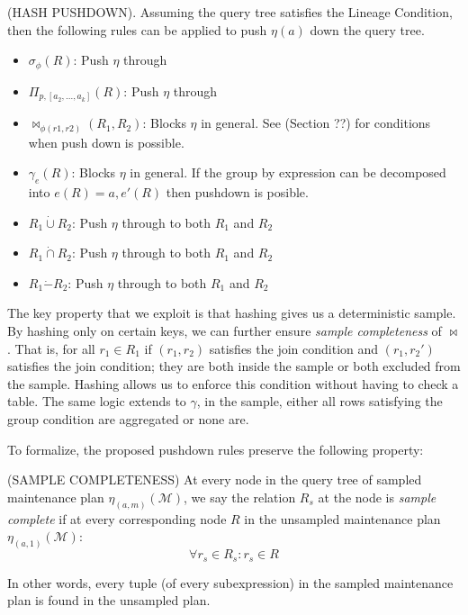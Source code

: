 \begin{proposition}
(HASH PUSHDOWN). Assuming the query tree satisfies the Lineage Condition, then the following rules can be applied to push $\eta(a)$ down the query tree. 
\begin{itemize}\vspace{-.45em}
\item $\sigma_{\phi}(R)$: Push $\eta$ through \vspace{-.45em}
\item $\Pi_{p,[a_2,...,a_k]}(R)$: Push $\eta $ through \vspace{-.45em}
\item $\bowtie_{\phi (r1,r2)}(R_1,R_2)$: Blocks $\eta $ in general. See (Section ??) for conditions when push down is possible.
\item $\gamma_{e}(R)$: Blocks $\eta$ in general. If the group by expression can be decomposed into $e(R) = a, e'(R)$ then pushdown is posible.\vspace{-.45em}
\item $R_1 \dot{\cup} R_2$: Push $\eta $ through to both $R_1$ and $R_2$
\item $R_1 \dot{\cap} R_2$: Push $\eta $ through to both $R_1$ and $R_2$
\item $R_1 \dot{-} R_2$: Push $\eta $ through to both $R_1$ and $R_2$
\end{itemize}
\end{proposition}

The key property that we exploit is that hashing gives us a deterministic sample.
By hashing only on certain keys, we can further ensure \emph{sample completeness} of $\bowtie$.
That is, for all $r_1\in R_1$ if $(r_1,r_2)$ satisfies the join condition and $(r_1,r_2')$ satisfies the join condition; they are both inside the sample or both excluded from the sample. 
Hashing allows us to enforce this condition without having to check a table.
The same logic extends to $\gamma$, in the sample, either all rows satisfying the group condition are aggregated or none are.

To formalize, the proposed pushdown rules preserve the following property:
\begin{proposition} (SAMPLE COMPLETENESS) At every node in the query tree of sampled maintenance plan $\eta_{(a,m)}(\mathcal{M})$, we say the relation $R_s$ at the node is \emph{sample complete} if at every corresponding node $R$ in the unsampled maintenance plan $\eta_{(a,1)}(\mathcal{M})$:
\[ \forall r_s \in R_s : r_s \in R \]
\end{proposition}
In other words, every tuple (of every subexpression) in the sampled maintenance plan is found in the unsampled plan. 

